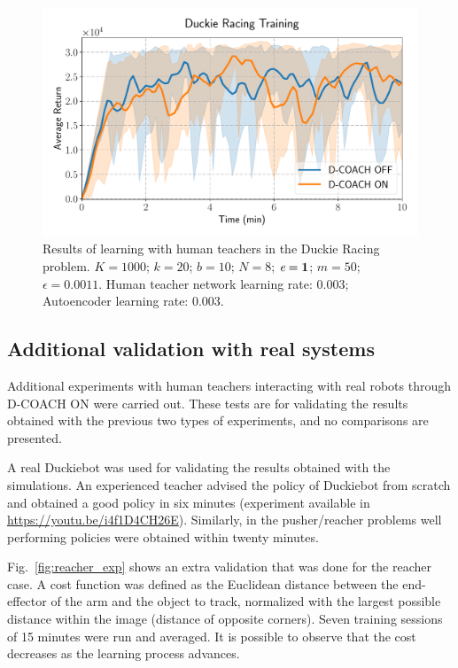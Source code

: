 \begin{figure}[H]
    \centering
    \includegraphics[width=0.8\linewidth]{imagenes/cap3/duckie_human_teacher_ICRA.pdf}
    \caption{Results of learning with human teachers in the Duckie Racing problem. $K = 1000$; $k=20$; $b = 10$; $N = 8$; $\emph{e}=\textbf{1}$; $m=50$; $\epsilon=0.0011$. Human teacher network learning rate: $0.003$; Autoencoder learning rate: $0.003$.}
    \label{fig:humanteachers2}
\end{figure}

\subsection{Additional validation with real systems}

Additional experiments with human teachers interacting with real robots through D-COACH ON were carried out. These tests are for validating the results obtained with the previous two types of experiments, and no comparisons are presented.

A real Duckiebot was used for validating the results obtained with the simulations. An experienced teacher advised the policy of Duckiebot from scratch and obtained a good policy in six minutes (experiment available in \url{https://youtu.be/i4f1D4CH26E}). Similarly, in the pusher/reacher problems well performing policies were obtained within twenty minutes. 

Fig.~\ref{fig:reacher_exp} shows an extra validation that was done for the reacher case. A cost function was defined as the Euclidean distance between the end-effector of the arm and the object to track, normalized with the largest possible distance within the image (distance of opposite corners). Seven training sessions of 15 minutes were run and averaged. It is possible to observe that the cost decreases as the learning process advances. 


